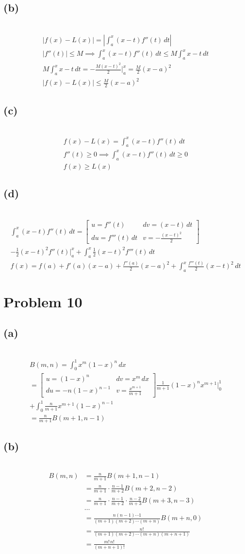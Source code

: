 \documentclass[12pt]{article}
\newcommand{\problem}[1]{\section{Problem #1}}
\newcommand{\subproblem}[1]{\subsection{(#1)} \,}
\begin{document}
\subproblem{b}
\begin{gather*}
    |f(x)-L(x)|=|\int_a^x (x-t)f''(t)\, dt|\\
    |f''(t)| \le M \implies \int_a^x (x-t)f''(t)\, dt \le M \int_a^x x-t\, dt\\
    M \int_a^x x-t\, dt= -\frac{M(x-t)^2}{2}\Big|^x_a = \frac{M}{2}(x-a)^2\\
    \boxed{|f(x)-L(x)| \le \frac{M}{2}(x-a)^2}
\end{gather*}

\subproblem{c}
\begin{gather*}
    f(x)-L(x)=\int_a^x (x-t)f''(t)\,dt\\
    f''(t)\ge  0 \implies \int_a^x (x-t)f''(t)\,dt\ge 0\\
    \boxed{f(x) \ge L(x)}
\end{gather*}

\subproblem{d}
\begin{gather*}
    \int_a^x (x-t)f''(t)\, dt =
    \begin{bmatrix}
        u=f''(t) & dv=(x-t)\, dt\\
        du = f'''(t)\, dt & v = -\frac{(x-t)^2}{2}
    \end{bmatrix}\\
    -\frac{1}{2}(x-t)^2f''(t)\Big|^x_a + \int_a^x \frac{1}{2}(x-t)^2f'''(t)\, dt\\
    \boxed{f(x)=f(a)+f'(a)(x-a)+\frac{f''(a)}{2}(x-a)^2+\int_a^x \frac{f'''(t)}{2}(x-t)^2 \, dt}
\end{gather*}

\problem{10}

\subproblem{a}
\begin{gather*}
    B(m,n) = \int_0^1 x^m (1-x)^n \, dx\\
    =\begin{bmatrix}
        u=(1-x)^n & dv=x^m\, dx\\
        du=-n(1-x)^{n-1} & v=\frac{x^{m+1}}{m+1}
    \end{bmatrix}
    \frac{1}{m+1}(1-x)^nx^{m+1}\Big|^1_0 \\+  \int_0^1 \frac{n}{m+1}x^{m+1}(1-x)^{n-1}\\
    = \boxed{\frac{n}{m+1} B(m+1,n-1)}
\end{gather*}

\subproblem{b}
\begin{align*}
    B(m,n)&=\frac{n}{m+1}B(m+1,n-1)\\
    &=\frac{n}{m+1} \cdot \frac{n-1}{m+2}B(m+2,n-2)\\
    &= \frac{n}{m+1} \cdot \frac{n-1}{m+2} \cdot \frac{n-2}{m+3}B(m+3,n-3)\\
    &\dots \\
    &=\frac{n(n-1) \cdots 1}{(m+1)(m+2)\cdots (m+n)}B(m+n,0)\\
    &=\frac{n!}{(m+1)(m+2)\cdots (m+n)(m+n+1)}\\
    &=\boxed{\frac{m!\, n!}{(m+n+1)!}}
\end{align*}
\end{document}
